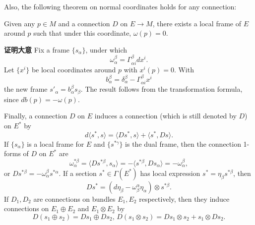Also, the following theorem on normal coordinates holds for any connection:

\begin{theorem}{}
Given any $p\in M$ and a connection $D$ on $E\to M$, there exists a local frame of $E$ around $p$ such that under this coordinate, $\omega(p)=0$.
\end{theorem}
\textbf{证明大意} Fix a frame $\{s_\alpha\}$, under which
$$\omega^\beta_\alpha=\Gamma_{\alpha i}^\beta dx^i.$$
Let $\{x^i\}$ be local coordinates around $p$ with $x^i(p)=0$. With
$$b_\alpha^\beta=\delta_\alpha^\beta-\Gamma_{\alpha i}^\beta x^i$$
the new frame $s'_\alpha=b_\alpha^\beta s_\beta$. The result follows from the transformation formula, since $db(p)=-\omega(p)$.

Finally, a connection $D$ on $E$ induces a connection (which is still denoted by $D$) on $E^*$ by
$$d\langle s^*,s\rangle=\langle Ds^*,s\rangle+\langle s^*,Ds\rangle.$$
If $\{s_\alpha\}$ is a local frame for $E$ and $\{s^{*\gamma}\}$ is the dual frame, then the connection 1-forms of $D$ on $E^*$ are
$$\omega^{*\beta}_\alpha=\langle Ds^{*\beta},s_\alpha\rangle=-\langle s^{*\beta},Ds_\alpha\rangle=-\omega^\beta_\alpha,$$
or $Ds^{*\beta}=-\omega^\beta_\alpha s^{*\alpha}$. If a section $s^*\in\Gamma(E^*)$ has local expression $s^*=\eta_\beta s^{*\beta}$, then
$$Ds^*=(d\eta_\beta-\omega_\beta^\alpha\eta_\alpha)\otimes s^{*\beta}.$$
If $D_1,D_2$ are connections on bundles $E_1,E_2$ respectively, then they induce connections on $E_1\oplus E_2$ and $E_1\otimes E_2$ by
$$D(s_1\oplus s_2)=Ds_1\oplus Ds_2,\,D(s_1\otimes s_2)=Ds_1\otimes s_2+s_1\otimes Ds_2.$$